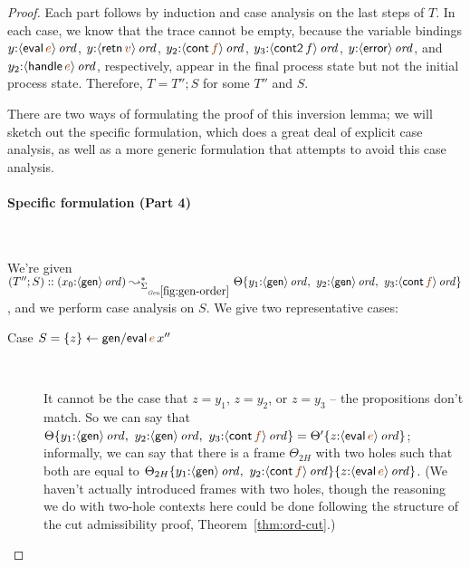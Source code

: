 \begin{proof}
  Each part follows by induction and case analysis on the last steps
  of $T$.  In each case, we know that the trace cannot be empty,
  because the variable bindings $y{:}\istrue{\susp{{\sf
        eval}\,\lf{e}}}$, $y{:}\istrue{\susp{{\sf retn}\,\lf{v}}}$,
  $y_2{:}\istrue{\susp{{\sf cont}\,\lf{f}}}$,
  $y_3{:}{\langle {{\sf cont2}\,f} \rangle}\,{{\it ord}}$, $y{:}{\langle {{\sf
        error}} \rangle}\,{{\it ord}}$, and $y_2{:}\istrue{\susp{{\sf handle}\,\lf{e}}}$,
  respectively, appear in the final process state but not the initial
  process state. Therefore, $T =
  T''; S$ for some $T''$ and $S$. 

  There are two ways of formulating the proof of this inversion lemma;
  we will sketch out the specific formulation, which does a great deal
  of explicit case analysis, as well as a more generic formulation
  that attempts to avoid this case analysis. 

  \paragraph{Specific formulation (Part 4)} ~

   \noindent
   We're given $(T''; S) :: (x_0{:}\istrue{\susp{{\sf gen}}})
  \leadsto^*_{\siggenorder} \tackon{\Theta}{y_1{:}\istrue{\susp{{\sf
          gen}}}, ~ y_2{:}\istrue{\susp{{\sf gen}}}, ~ y_3{:}\istrue{\susp{{\sf cont}\,\lf{f}}}}$, and we
  perform case analysis on $S$. We give two representative cases:

  \begin{description}
  \item[Case $S = \trstep{z}{{\sf gen/eval}\,\lf{e}\,x''}$]~

    It cannot be the case that $z = y_1$, $z = y_2$, or $z = y_3$ -- the
    propositions don't match. So we can say that
    $\tackon{\Theta}{y_1{:}\istrue{\susp{{\sf gen}}}, ~
      y_2{:}\istrue{\susp{{\sf gen}}}, ~
      y_3{:}\istrue{\susp{{\sf cont}\,\lf{f}}}} =
    \tackon{\Theta'}{z{:}\istrue{\susp{{\sf eval}\,\lf{e}}}}$; informally,
    we can say that there is a frame $\Theta_{2H}$ with two holes
    such that both are equal to
         $\tackon{
             \tackon{\Theta_{2H}}
                {y_1{:}\istrue{\susp{{\sf gen}}}, ~ 
                 y_2{:}\istrue{\susp{{\sf cont}\,\lf{f}}}}}
             {z{:}\istrue{\susp{{\sf eval}\,\lf{e}}}}$.
    (We haven't actually introduced frames with two holes,
    though the reasoning we do with two-hole contexts here could be done
    following the structure of the cut admissibility proof,
    Theorem~\ref{thm:ord-cut}.)


\end{description}
\end{proof}
